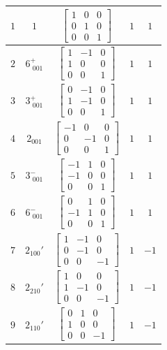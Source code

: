\documentclass[fleqn,8pt]{jsarticle}
\begin{document}
\begin{longtable}{ccccc}
$ 1 $ & $ 1 $ & $ \begin{bmatrix} 1 & 0 & 0 \\ 0 & 1 & 0 \\ 0 & 0 & 1 \end{bmatrix} $ & $ 1 $ & $ 1 $ \\ \hline
$ 2 $ & $ 6^{+}_{\,\,001} $ & $ \begin{bmatrix} 1 & -1 & 0 \\ 1 & 0 & 0 \\ 0 & 0 & 1 \end{bmatrix} $ & $ 1 $ & $ 1 $ \\ \hline
$ 3 $ & $ 3^{+}_{\,\,001} $ & $ \begin{bmatrix} 0 & -1 & 0 \\ 1 & -1 & 0 \\ 0 & 0 & 1 \end{bmatrix} $ & $ 1 $ & $ 1 $ \\ \hline
$ 4 $ & $ 2{}_{001} $ & $ \begin{bmatrix} -1 & 0 & 0 \\ 0 & -1 & 0 \\ 0 & 0 & 1 \end{bmatrix} $ & $ 1 $ & $ 1 $ \\ \hline
$ 5 $ & $ 3^{-}_{\,\,001} $ & $ \begin{bmatrix} -1 & 1 & 0 \\ -1 & 0 & 0 \\ 0 & 0 & 1 \end{bmatrix} $ & $ 1 $ & $ 1 $ \\ \hline
$ 6 $ & $ 6^{-}_{\,\,001} $ & $ \begin{bmatrix} 0 & 1 & 0 \\ -1 & 1 & 0 \\ 0 & 0 & 1 \end{bmatrix} $ & $ 1 $ & $ 1 $ \\ \hline
$ 7 $ & $ 2{}_{100}{}' $ & $ \begin{bmatrix} 1 & -1 & 0 \\ 0 & -1 & 0 \\ 0 & 0 & -1 \end{bmatrix} $ & $ 1 $ & $ -1 $ \\ \hline
$ 8 $ & $ 2{}_{210}{}' $ & $ \begin{bmatrix} 1 & 0 & 0 \\ 1 & -1 & 0 \\ 0 & 0 & -1 \end{bmatrix} $ & $ 1 $ & $ -1 $ \\ \hline
$ 9 $ & $ 2{}_{110}{}' $ & $ \begin{bmatrix} 0 & 1 & 0 \\ 1 & 0 & 0 \\ 0 & 0 & -1 \end{bmatrix} $ & $ 1 $ & $ -1 $ \\ \hline

\end{longtable}
\end{document}

